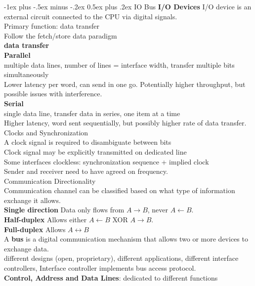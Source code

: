\documentclass[letterpaper, 8pt]{extarticle}
\makeatletter
\renewcommand{\section}{\@startsection{section}{1}{0mm}%
                                {-1ex plus -.5ex minus -.2ex}%
                                {0.5ex plus .2ex}%
                                {\normalfont\normalsize\bfseries}}
\makeatother
\begin{document}
\begin{multicols*}{6}
    \section{IO Bus}
	\textbf{I/O Devices}
	I/O device is an external circuit connected to the CPU via digital signals. \\
	Primary function: data transfer\\
	Follow the fetch/store data paradigm\\
	\textbf{data transfer}\\
	\textbf{Parallel}\\
	multiple data lines, 	number of lines = interface width, transfer multiple bits simultaneously\\
	Lower latency per word, can send in one go. Potentially higher throughput, but possible issues with interference.\\
	\textbf{Serial}\\
	single data line, 	transfer data in series, one item at a time\\
	Higher latency, word sent sequentially, but possibly higher rate of data transfer.\\
	Clocks and Synchronization\\
	A clock signal is required to disambiguate between bits\\
	Clock signal may be explicitly transmitted on dedicated line\\
	Some interfaces clockless: synchronization sequence + implied clock\\
	Sender and receiver need to have agreed on frequency.\\
	Communication Directionality\\
	Communication channel can be classified based on what type of information exchange it allows.\\
	\textbf{Single direction} Data only flows from $A \rightarrow B$, never $A \leftarrow B$.\\
	\textbf{Half-duplex} Allows either $A \leftarrow B$ XOR $A \rightarrow B$.\\
	\textbf{Full-duplex} Allows $A \leftrightarrow B$\\
	A \textbf{bus} is a digital communication mechanism that allows two or more devices to exchange data.\\
different designs (open, proprietary), different applications, different interface controllers, Interface controller implements bus access protocol.\\
	\textbf{Control, Address and Data Lines}: dedicated to different functions\\

\end{multicols*}
\end{document}
